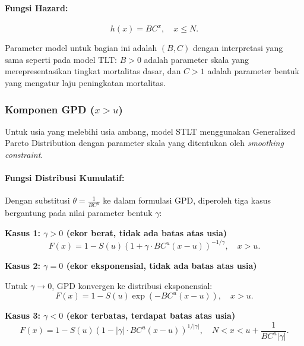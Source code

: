 \paragraph{Fungsi Hazard:}
\begin{equation}
h(x) = BC^x, \quad x \leq N.
\label{eq:stlt_gompertz_hazard}
\end{equation}

Parameter model untuk bagian ini adalah $(B, C)$ dengan interpretasi yang sama seperti pada model TLT: $B > 0$ adalah parameter skala yang merepresentasikan tingkat mortalitas dasar, dan $C > 1$ adalah parameter bentuk yang mengatur laju peningkatan mortalitas.

\subsubsection{Komponen GPD ($x > u$)}

Untuk usia yang melebihi usia ambang, model STLT menggunakan Generalized Pareto Distribution dengan parameter skala yang ditentukan oleh \textit{smoothing constraint}.

\paragraph{Fungsi Distribusi Kumulatif:}

Dengan substitusi $\theta = \frac{1}{BC^u}$ ke dalam formulasi GPD, diperoleh tiga kasus bergantung pada nilai parameter bentuk $\gamma$:

\textbf{Kasus 1: $\gamma > 0$ (ekor berat, tidak ada batas atas usia)}
\begin{equation}
F(x) = 1 - S(u) \left(1 + \gamma \cdot BC^u(x-u)\right)^{-1/\gamma}, \quad x > u.
\label{eq:stlt_gpd_cdf_positive}
\end{equation}

\textbf{Kasus 2: $\gamma = 0$ (ekor eksponensial, tidak ada batas atas usia)}

Untuk $\gamma \to 0$, GPD konvergen ke distribusi eksponensial:
\begin{equation}
F(x) = 1 - S(u) \exp\left(-BC^u(x-u)\right), \quad x > u.
\label{eq:stlt_gpd_cdf_zero}
\end{equation}

\textbf{Kasus 3: $\gamma < 0$ (ekor terbatas, terdapat batas atas usia)}
\begin{equation}
F(x) = 1 - S(u) \left(1 - |\gamma| \cdot BC^u(x-u)\right)^{1/|\gamma|}, \quad N < x < u + \frac{1}{BC^u|\gamma|}.
\label{eq:stlt_gpd_cdf_negative}
\end{equation}

